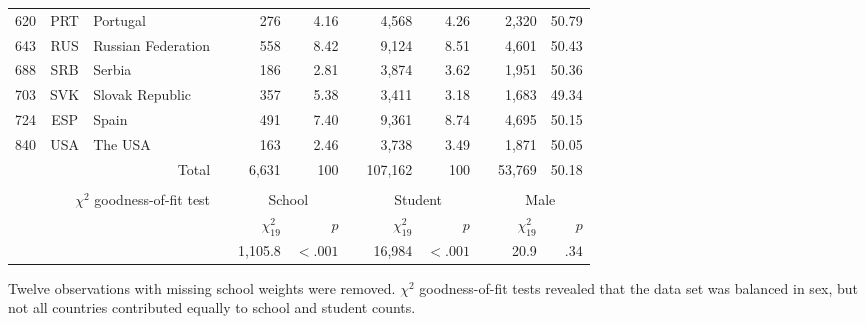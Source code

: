 {\begin{tabular}{ccl c rr c rr c rr}
      620   & PRT   & Portugal &       & 276   & 4.16 &       & 4,568  & 4.26 &       & 2,320  & 50.79 \\
      643   & RUS   & Russian Federation &       & 558   & 8.42 &       & 9,124  & 8.51 &       & 4,601  & 50.43 \\
      688   & SRB   & Serbia &       & 186   & 2.81 &       & 3,874  & 3.62 &       & 1,951  & 50.36 \\
      703   & SVK   & Slovak Republic &       & 357   & 5.38 &       & 3,411  & 3.18 &       & 1,683  & 49.34 \\
      724   & ESP   & Spain &       & 491   & 7.40 &       & 9,361  & 8.74 &       & 4,695  & 50.15 \\
      840   & USA   & The USA &       & 163   & 2.46 &       & 3,738  & 3.49 &       & 1,871  & 50.05 \\
      \bottomrule
            &       & \multicolumn{1}{r}{Total} &       & 6,631  & 100 &       & 107,162 & 100 &       & 53,769 & 50.18 \\
      &&&&&&&&&&&\\
      \multicolumn{3}{r}{$\chi^2$ goodness-of-fit test} && \multicolumn{2}{c}{School} &       & \multicolumn{2}{c}{Student} &       & \multicolumn{2}{c}{Male} \\
      \cmidrule{5-6}\cmidrule{8-9}\cmidrule{11-12}
      &&&& $\chi^2_{19}$ & $p$ && $\chi^2_{19}$ & $p$ && $\chi^2_{19}$ & $p$\\
      \cmidrule{5-12}
      &&&& 1,105.8 & $<.001$ && 16,984 & $<.001$ && 20.9 & $.34$\\
      \end{tabular}
}{Twelve observations with missing school weights were removed. $\chi^2$ goodness-of-fit tests revealed that the data set was balanced in sex, but not all countries contributed equally to school and student counts.}